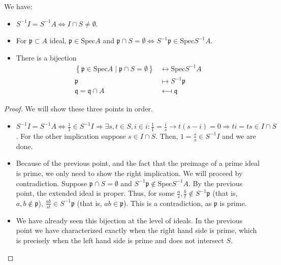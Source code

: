         \begin{theorem}
            We have:
            \begin{itemize}
                \item $S^{-1}I = S^{-1}A \Leftrightarrow I \cap S \neq \emptyset$.
                \item For $\mathfrak{p} \subset A$ ideal, $\mathfrak{p}\in\text{Spec} A$ and
                $\mathfrak{p} \cap S = \emptyset \Leftrightarrow S^{-1}\mathfrak{p} \in\text{Spec} S^{-1}A$.
                \item There is a bijection
                \[
                    \begin{aligned}
                        \left\{ \mathfrak{p} \in\text{Spec} A \mid \mathfrak{p} \cap S = \emptyset \right\} &\longleftrightarrow\text{Spec} S^{-1}A \\
                        \mathfrak{p} &\longmapsto S^{-1}\mathfrak{p} \\
                        \mathfrak{q} = \mathfrak{q} \cap A &\longmapsfrom \mathfrak{q}
                    \end{aligned}
                \]
            \end{itemize}

            \begin{proof}

                We will show these three points in order.

                \begin{itemize}
                    \item $S^{-1}I = S^{-1}A \Leftrightarrow \frac{1}{1} \in S^{-1}I \Rightarrow
                    \exists s, t \in S, i \in i \colon \frac{1}{1} = \frac{i}{s} \rightarrow t (s - i) = 0
                    \Rightarrow ti = ts \in I \cap S$.
                    For the other implication suppose $s \in I \cap S$.
                    Then, $1 = \frac{s}{s} \in S^{-1}I$ and we are done.
                    \item Because of the previous point,
                    and the fact that the preimage of a prime ideal is prime,
                    we only need to show the right implication.
                    We will proceed by contradiction.
                    Suppose
                    $\mathfrak{p} \cap S = \emptyset$ and $S^{-1}\mathfrak{p} \notin\text{Spec} S^{-1}A$.
                    By the previous point, the extended ideal is proper.
                    Thus, for some $\frac{a}{s}, \frac{b}{t} \notin S^{-1}\mathfrak{p}$
                    (that is, $a, b \notin \mathfrak{p}$),
                    $\frac{ab}{st} \in S^{-1}\mathfrak{p}$ (that is, $ab \in \mathfrak{p}$).
                    This is a contradiction, as $\mathfrak{p}$ is prime.
                    \item We have already seen this bijection at the level of ideals.
                    In the previous point we have characterized exactly when the right hand side is prime,
                    which is precisely when the left hand side is prime and does not intersect $S$.



\end{itemize}
\end{proof}
\end{theorem}
